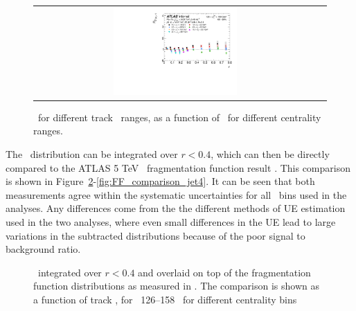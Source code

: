 \begin{figure}
{\begin{tabular}{cc}
	 \includegraphics[width=0.45\textwidth]{figures_results/RDpT_dR_jet7_cent5} \\
\end{tabular} }
   \caption{\RDptr\ for different track \pt\ ranges, as a function of \rvar\ for different centrality ranges.}
      \label{fig:rdptcent}
\end{figure}


The \Rdptr\ distribution can be integrated over $ r < 0.4 $, which can then be directly compared to the ATLAS 5 TeV \pbpb\ fragmentation function result \cite{ATLAS502FFConf}. This comparison is shown in Figure~\ref{fig:FF_comparison_jet1}-\ref{fig:FF_comparison_jet4}. It can be seen that both measurements agree within the systematic uncertainties for all \ptjet\ bins used in the analyses. Any differences come from the the different methods of UE estimation used in the two analyses, where even small differences in the UE lead to large variations in the subtracted distributions because of the poor signal to background ratio.

\begin{figure}
\caption{\Rdptr\ integrated over $ r < 0.4$ and overlaid on top of the fragmentation function distributions as measured in \cite{ATLAS502FFConf}. The comparison is shown as a function of track \pt, for \ptjet\ 126--158 \GeV\,  for different centrality bins }
\label{fig:FF_comparison_jet1}
\end{figure}

